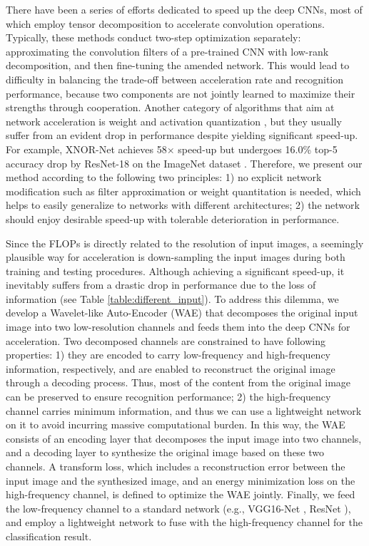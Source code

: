 \documentclass[letterpaper]{article} %
\begin{document}
There have been a series of efforts dedicated to speed up the deep CNNs, most of which \cite{lebedev2014speeding,tai2015convolutional} employ tensor decomposition to accelerate convolution operations. Typically, these methods conduct two-step optimization separately: approximating the convolution filters of a pre-trained CNN with low-rank decomposition, and then fine-tuning the amended network. This would lead to difficulty in balancing the trade-off between acceleration rate and recognition performance, because two components are not jointly learned to maximize their strengths through cooperation. Another category of algorithms that aim at network acceleration is weight and activation quantization \cite{rastegari2016xnor,cai2017deep,chen2015compressing}, but they usually suffer from an evident drop in performance despite yielding significant speed-up. For example, XNOR-Net \cite{rastegari2016xnor} achieves 58$\times$ speed-up but undergoes 16.0\% top-5 accuracy drop by ResNet-18 on the ImageNet dataset \cite{russakovsky2015imagenet}. Therefore, we present our method according to the following two principles: 1) no explicit network modification such as filter approximation or weight quantitation is needed, which helps to easily generalize to networks with different architectures; 2) the network should enjoy desirable speed-up with tolerable deterioration in performance.


Since the FLOPs is directly related to the resolution of input images, a seemingly plausible way for acceleration is down-sampling the input images during both training and testing procedures. Although achieving a significant speed-up, it inevitably suffers from a drastic drop in performance due to the loss of information (see Table \ref{table:different_input}). To address this dilemma, we develop a Wavelet-like Auto-Encoder (WAE) that decomposes the original input image into two low-resolution channels and feeds them into the deep CNNs for acceleration. Two decomposed channels are constrained to have following properties: 1) they are encoded to carry low-frequency and high-frequency information, respectively, and are enabled to reconstruct the original image through a decoding process. Thus, most of the content from the original image can be preserved to ensure recognition performance; 2) the high-frequency channel carries minimum information, and thus we can use a lightweight network on it to avoid incurring massive computational burden. In this way, the WAE consists of an encoding layer that decomposes the input image into two channels, and a decoding layer to synthesize the original image based on these two channels. A transform loss, which includes a reconstruction error between the input image and the synthesized image, and an energy minimization loss on the high-frequency channel, is defined to optimize the WAE jointly. Finally, we feed the low-frequency channel to a standard network (e.g., VGG16-Net \cite{simonyan2014very}, ResNet \cite{he2016deep}), and employ a lightweight network to fuse with the high-frequency channel for the classification result.
\end{document}
